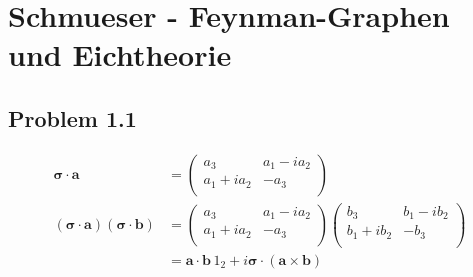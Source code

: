 \documentclass[../main.tex]{subfiles}
\begin{document}
\section{{\sc Schmueser} - Feynman-Graphen und Eichtheorie}
\subsection{Problem 1.1}
\begin{align}
\mathbf{\sigma}\cdot\mathbf{a}&=
\left(\begin{matrix}
a_3 & a_1-ia_2\\
a_1+ia_2 & -a_3\\
\end{matrix}\right)\\
(\mathbf{\sigma}\cdot\mathbf{a})(\mathbf{\sigma}\cdot\mathbf{b})&=
\left(\begin{matrix}
a_3 & a_1-ia_2\\
a_1+ia_2 & -a_3\\
\end{matrix}\right)\left(\begin{matrix}
b_3 & b_1-ib_2\\
b_1+ib_2 & -b_3\\
\end{matrix}\right)\\
&=\mathbf{a}\cdot\mathbf{b}\,1_2+i\mathbf{\sigma}\cdot(\mathbf{a}\times\mathbf{b})
\end{align}
\end{document}
